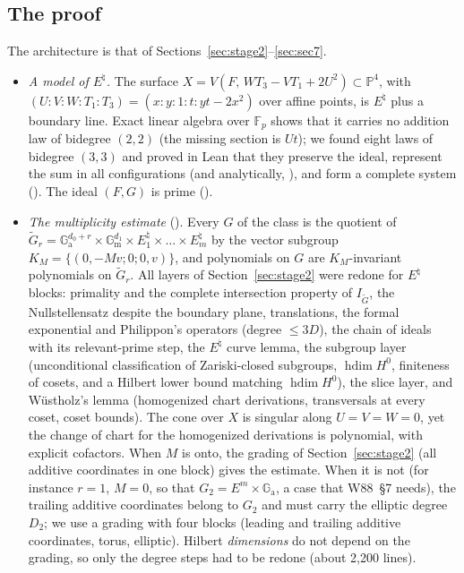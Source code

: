 \documentclass[11pt]{amsart}
\theoremstyle{definition}
\theoremstyle{remark}
\numberwithin{equation}{section}
\newcommand{\PP}{\mathbb{P}}
\newcommand{\Ga}{\mathbb{G}_{\mathrm{a}}}
\newcommand{\Gm}{\mathbb{G}_{\mathrm{m}}}
\newcommand{\hdim}{\operatorname{hdim}}
\begin{document}
\subsection{The proof}
The architecture is that of Sections~\ref{sec:stage2}--\ref{sec:sec7}.
\begin{itemize}
\item \emph{A model of $E^\natural$.} The surface $X=V(F,\,WT_3-VT_1+2U^2)\subset\PP^4$, with $(U:V:W:T_1:T_3)=(x:y:1:t:yt-2x^2)$
over affine points, is $E^\natural$ plus a boundary line. Exact linear algebra over $\mathbb F_p$ shows that it
carries no addition law of bidegree $(2,2)$ (the missing section is $Ut$); we found eight laws of bidegree
$(3,3)$ and proved in Lean that they preserve the ideal, represent the sum in all configurations (and
analytically, ), and form a complete system (). The ideal $(F,G)$ is
prime ().
\item \emph{The multiplicity estimate}  (). Every $G$ of the class is
the quotient of $\tilde G_r=\Ga^{d_0+r}\times\Gm^{d_1}\times E_1^\natural\times\dots\times E_m^\natural$ by the vector
subgroup $K_M=\{(0,-Mv;0;0,v)\}$, and polynomials on $G$ are $K_M$-invariant polynomials on $\tilde G_r$. All
layers of Section~\ref{sec:stage2} were redone for $E^\natural$ blocks: primality and the complete
intersection property of $I_{\tilde G}$, the Nullstellensatz despite the boundary plane, translations, the
formal exponential and Philippon's operators (degree $\le3D$), the chain of ideals with its relevant-prime
step, the $E^\natural$ curve lemma, the subgroup layer (unconditional classification of Zariski-closed
subgroups, $\hdim H^0$, finiteness of cosets, and a Hilbert lower bound matching $\hdim H^0$), the slice
layer, and Wüstholz's lemma (homogenized chart derivations, transversals at every coset, coset bounds). The
cone over $X$ is singular along $U=V=W=0$, yet the change of chart for the homogenized derivations is
polynomial, with explicit cofactors. When $M$ is onto, the grading of Section~\ref{sec:stage2} (all additive
coordinates in one block) gives the estimate. When it is not (for instance $r=1$, $M=0$, so that
$G_2=E^m\times\Ga$, a case that W88~\S7 needs), the trailing additive coordinates belong to $G_2$ and must
carry the elliptic degree $D_2$; we use a grading with four blocks (leading and trailing additive
coordinates, torus, elliptic). Hilbert \emph{dimensions} do not depend on the grading, so only the degree
steps had to be redone (about 2{,}200 lines).

\end{itemize}
\end{document}
